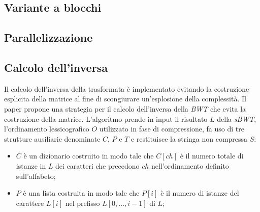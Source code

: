 \subsection{Variante a blocchi}
\subsection{Parallelizzazione}
\subsection{Calcolo dell'inversa}
Il calcolo dell'inversa della trasformata è implementato evitando la costruzione esplicita della matrice al fine di scongiurare un'esplosione della complessità. Il paper \cite{burrows1994block} propone una strategia per il calcolo dell'inversa della \emph{BWT} che evita la costruzione della matrice. L'algoritmo prende in input il risultato $L$ della \emph{sBWT}, l'ordinamento lessicografico $O$ utilizzato in fase di compressione, fa uso di tre strutture ausiliarie denominate $C$, $P$ e $T$ e restituisce la stringa non compressa $S$:
\begin{itemize}
    \item $C$ è un dizionario costruito in modo tale che $C[ch]$ è il numero totale di istanze in $L$ dei caratteri che precedono $ch$ nell'ordinamento definito sull'alfabeto;
    \item $P$ è una lista costruita in modo tale che $P[i]$ è il numero di istanze del carattere $L[i]$ nel prefisso $L[0,\dots,i-1]$ di $L$;
\end{itemize}
